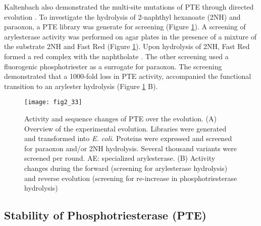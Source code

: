 \begin{refsection}
\begin{table}[htbp]
\begin{tabular}{llll}
    \hline  
    \end{tabular}
    \label{tab:gwt}
\end{table}

Kaltenbach  also demonstrated the multi-site mutations of
PTE through directed evolution \cite{Kaltenbach2015}. To investigate the
hydrolysis of 2-naphthyl hexanoate (2NH) and paraoxon, a PTE library was
generate for screening (Figure \ref{fig:2NH}). A screening of arylesterase
activity was performed on agar plates in the presence of a mixture of the
substrate 2NH and Fast Red (Figure \ref{fig:2NH}). Upon hydrolysis of 2NH, Fast
Red formed a red complex with the naphtholate \cite{Kaltenbach2015}. The other
screening used a fluorogenic phosphotriester as a surrogate for paraoxon. The
screening demonstrated that a 1000-fold loss in PTE activity, accompanied the
functional transition to an arylester hydrolysis \cite{Kaltenbach2015}
(Figure \ref{fig:2NH} B).
\begin{figure}[h!] \centering \texttt{[image: fig2\_33]}
    \caption[Activity and sequence changes of PTE over the evolution. (A)
    Overview of the experimental evolution. Libraries were generated and
    transformed into \emph{E. coli}. Proteins were expressed and screened for
    paraoxon and/or 2NH hydrolysis. Several thousand variants were screened per
    round. (B) Activity changes during the forward (screening for arylesterase
    hydrolysis) and reverse evolution (screening for re-increase in
phosphotriesterase hydrolysis).]{Activity and sequence changes of PTE over the
    evolution. (A) Overview of the experimental evolution. Libraries were
    generated and transformed into \emph{E. coli}. Proteins were expressed and
    screened for paraoxon and/or 2NH hydrolysis. Several thousand variants were
    screened per round. AE: specialized arylesterase. (B) Activity changes
    during the forward (screening for arylesterase hydrolysis) and reverse
    evolution (screening for re-increase in phosphotriesterase hydrolysis)
    \cite{Kaltenbach2015}} \label{fig:2NH}
\end{figure}

\subsection{Stability of Phosphotriesterase (PTE)}


\end{refsection}
